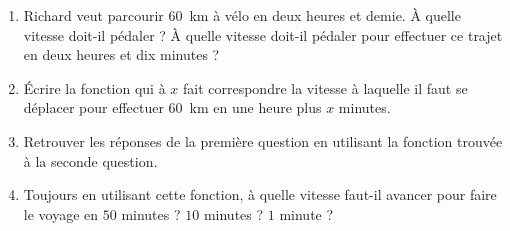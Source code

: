 

    \begin{enumerate}
        \item
    Richard veut parcourir \SI{60}{\kilo\meter} à vélo en deux heures et demie. À quelle vitesse doit-il pédaler ? À quelle vitesse doit-il pédaler pour effectuer ce trajet en deux heures et dix minutes ?

\item
    Écrire la fonction qui à \( x\) fait correspondre la vitesse à laquelle il faut se déplacer pour effectuer \SI{60}{\kilo\meter} en une heure plus \( x\) minutes.
\item
    Retrouver les réponses de la première question en utilisant la fonction trouvée à la seconde question.            
\item
    Toujours en utilisant cette fonction, à quelle vitesse faut-il avancer pour faire le voyage en \( 50\) minutes ? \( 10\) minutes ? \( 1\) minute ?
    \end{enumerate}




    

%

